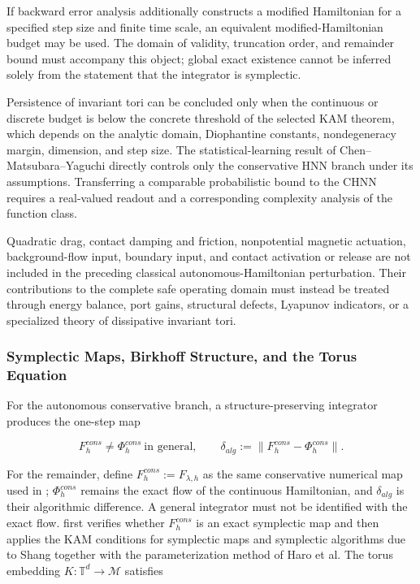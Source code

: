 If backward error analysis additionally constructs a modified Hamiltonian for a specified step size and finite time scale, an equivalent modified-Hamiltonian budget may be used. The domain of validity, truncation order, and remainder bound must accompany this object; global exact existence cannot be inferred solely from the statement that the integrator is symplectic.

Persistence of invariant tori can be concluded only when the continuous or discrete budget is below the concrete threshold of the selected KAM theorem, which depends on the analytic domain, Diophantine constants, nondegeneracy margin, dimension, and step size. The statistical-learning result of Chen--Matsubara--Yaguchi directly controls only the conservative HNN branch under its assumptions. Transferring a comparable probabilistic bound to the CHNN requires a real-valued readout and a corresponding complexity analysis of the function class.\cite{Chen2022KAMSLT}

Quadratic drag, contact damping and friction, nonpotential magnetic actuation, background-flow input, boundary input, and contact activation or release are not included in the preceding classical autonomous-Hamiltonian perturbation. Their contributions to the complete safe operating domain must instead be treated through energy balance, port gains, structural defects, Lyapunov indicators, or a specialized theory of dissipative invariant tori.

\subsubsection{Symplectic Maps, Birkhoff Structure, and the Torus Equation}\label{sec:hamiltonian-3-7-5}

For the autonomous conservative branch, a structure-preserving integrator produces the one-step map

\begin{equation}
\label{eq:hamiltonian-3-94}
F_{h}^{cons}\neq\Phi_{h}^{cons}\ \text{in general},\qquad \delta_{alg}:=\lVert F_{h}^{cons}-\Phi_{h}^{cons}\rVert.
\end{equation}

For the remainder, define \(F_{h}^{cons}:=F_{\lambda,h}\) as the same conservative numerical map used in ; \(\Phi_h^{cons}\) remains the exact flow of the continuous Hamiltonian, and \(\delta_{alg}\) is their algorithmic difference. A general integrator must not be identified with the exact flow.  first verifies whether \(F_{h}^{cons}\) is an exact symplectic map and then applies the KAM conditions for symplectic maps and symplectic algorithms due to Shang together with the parameterization method of Haro et al.\cite{FengQin2010,Shang1999KAMAlgorithms,Shang2000KAMMappings,Haro2016Parameterization} The torus embedding \(K:\mathbb{T}^{d}\rightarrow\mathcal{M}\) satisfies\cite{Haro2016Parameterization}

